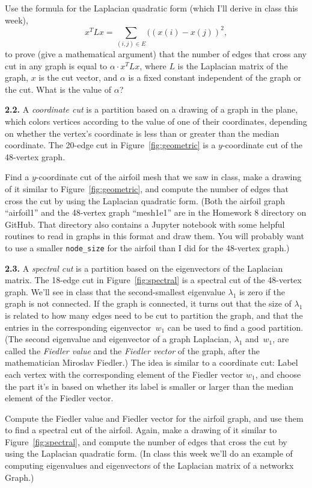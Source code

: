 \documentclass[11pt]{article}
\begin{document}
Use the formula for the Laplacian quadratic form (which I'll derive in class this week),
$$x^TLx = \sum_{(i,j)\in E}((x(i)-x(j))^2,$$
to prove (give a mathematical argument)
that the number of edges that cross any cut in any graph is equal to
$\alpha \cdot x^TLx$, 
where $L$ is the Laplacian matrix of the graph, 
$x$ is the cut vector,
and $\alpha$ is a fixed constant independent of the graph or the cut. 
What is the value of $\alpha$?

\par\medskip
{\bf 2.2.}
A {\em coordinate cut} is a partition based on a drawing of a graph in the plane,
which colors vertices according to the value of one of their coordinates,
depending on whether the vertex's coordinate is less than or greater than the
median coordinate.
The 20-edge cut in Figure~\ref{fig:geometric} 
is a $y$-coordinate cut of the 48-vertex graph.

Find a $y$-coordinate cut of the airfoil mesh that we saw in class,
make a drawing of it similar to Figure~\ref{fig:geometric}, 
and compute the number of edges that cross the cut by using the Laplacian quadratic form.
(Both the airfoil graph ``airfoil1'' and the 48-vertex graph ``mesh1e1'' are in
the Homework 8 directory on GitHub.
That directory also contains a Jupyter notebook with some helpful routines to
read in graphs in this format and draw them.
You will probably want to use a smaller {\tt node\_size} for the airfoil than 
I did for the 48-vertex graph.)

\par\medskip
{\bf 2.3.}
A {\em spectral cut} is a partition based on the eigenvectors of the Laplacian matrix.
The 18-edge cut in Figure~\ref{fig:spectral} is a spectral cut of the 48-vertex graph.
We'll see in class that the second-smallest eigenvalue $\lambda_1$ is zero if the graph is
not connected.
If the graph is connected, it turns out that
the size of $\lambda_1$ is related to how many edges need to be cut to partition the 
graph, and that the entries in the corresponding eigenvector~$w_1$ can be used to
find a good partition.
(The second eigenvalue and eigenvector of a graph Laplacian, $\lambda_1$ and~$w_1$,
are called the {\em Fiedler value} and the {\em Fiedler vector} of the graph, 
after the mathematician Miroslav Fiedler.)
The idea is similar to a coordinate cut:
Label each vertex with the corresponding element of the Fiedler vector $w_1$,
and choose the part it's in based on whether its label is smaller or larger
than the median element of the Fiedler vector.

Compute the Fiedler value and Fiedler vector for the airfoil graph, 
and use them to find a spectral cut of the airfoil.
Again, make a drawing of it similar to Figure~\ref{fig:spectral}, 
and compute the number of edges that cross the cut by using the Laplacian quadratic form.
(In class this week we'll do an example of computing eigenvalues and eigenvectors 
of the Laplacian matrix of a networkx Graph.)
\end{document}
